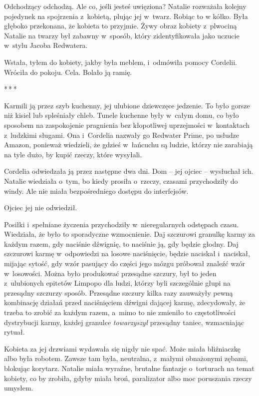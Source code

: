 \documentclass[oneside,polish,11pt,sfheadings]{mwbk}
\newcommand{\threeast}{\bigskip\par\centerline{*\,*\,*}\medskip\par}
\begin{document}
Odchodzący odchodzą. Ale co, jeśli jesteś uwięziona? Natalie rozważała
kolejny pojedynek na spojrzenia z~kobietą, plując jej w~twarz. Robiąc to
w kółko. Była głęboko przekonana, że kobieta to przyjmie. Żywy obraz
kobiety z~plwociną Natalie na twarzy był zabawny w~sposób, który
zidentyfikowała jako uczucie w~stylu Jacoba Redwatera.

Wstała, tyłem do kobiety, jakby była meblem, i~odmówiła pomocy Cordelii.
Wróciła do pokoju. Cela. Bolało ją ramię.

\threeast

Karmili ją przez szyb kuchenny, jej ulubione dziewczęce jedzenie. To
było gorsze niż kisiel lub spleśniały chleb. Tunele kuchenne były w~całym domu, co było sposobem na zaspokojenie pragnienia bez kłopotliwej
uprzejmości w~kontaktach z~ludzkimi sługami. Ona i~Cordelia nazwały go
Redwater Prime, po usłudze Amazon, ponieważ wiedzieli, że gdzieś w~łańcuchu są ludzie, którzy nie zarabiają na tyle dużo, by kupić rzeczy,
które wysyłali.

Cordelia odwiedzała ją przez następne dwa dni. Dom -- jej ojciec -- wysłuchał ich. Natalie wiedziała o~tym, bo kiedy prosiła o~rzeczy,
czasami przychodziły do windy. Ale nie miała bezpośredniego dostępu do
interfejsów.

Ojciec jej nie odwiedził.

Posiłki i~spełniane życzenia przychodziły w~nieregularnych odstępach
czasu. Wiedziała, że było to sporadyczne wzmocnienie. Daj szczurowi
granulkę karmy za każdym razem, gdy naciśnie dźwignię, to naciśnie ją,
gdy będzie głodny. Daj szczurowi karmę w~odpowiedzi na losowe
naciśnięcie, będzie naciskał i~naciskał, mijając sytość, gdy wzór
pasujący do części jego mózgu próbował znaleźć wzór w~losowości. Można
było produkować przesądne szczury, był to jeden z~ulubionych epitetów
Limpopo dla ludzi, którzy byli szczególnie głupi na przesądny szczurzy
sposób. Przesądne szczury kilka razy zauważyły pewną kombinację działań
przed naciśnięciem dźwigni dającej karmę, zdecydowały, że trzeba to
zrobić za każdym razem, a~mimo to nie zmieniło to częstotliwości
dystrybucji karmy, każdej granulce \textit{towarzyszył }przesądny taniec,
wzmacniając rytuał.

Kobieta za jej drzwiami wydawała się nigdy nie spać. Może miała
bliźniaczkę albo była robotem. Zawsze tam była, neutralna, z~małymi
obnażonymi zębami, blokując korytarz. Natalie miała wyraźne, brutalne
fantazje o~torturach na temat kobiety, co by zrobiła, gdyby miała broń,
paralizator albo moc poruszania rzeczy umysłem.
\end{document}
